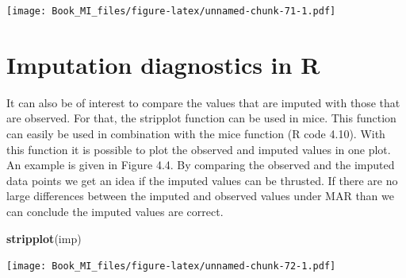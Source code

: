 \documentclass[]{book}
\newenvironment{Shaded}{\begin{snugshade}}{\end{snugshade}}
\newcommand{\KeywordTok}[1]{\textcolor[rgb]{0.13,0.29,0.53}{\textbf{#1}}}
\newcommand{\NormalTok}[1]{#1}
\begin{document}
\texttt{[image: Book\_MI\_files/figure-latex/unnamed-chunk-71-1.pdf]}

\section{Imputation diagnostics in R}\label{imputation-diagnostics-in-r}

It can also be of interest to compare the values that are imputed with
those that are observed. For that, the stripplot function can be used in
mice. This function can easily be used in combination with the mice
function (R code 4.10). With this function it is possible to plot the
observed and imputed values in one plot. An example is given in Figure
4.4. By comparing the observed and the imputed data points we get an
idea if the imputed values can be thrusted. If there are no large
differences between the imputed and observed values under MAR than we
can conclude the imputed values are correct.

\begin{Shaded}
\begin{Highlighting}[]
\KeywordTok{stripplot}\NormalTok{(imp)}
\end{Highlighting}
\end{Shaded}

\texttt{[image: Book\_MI\_files/figure-latex/unnamed-chunk-72-1.pdf]}


\end{document}
